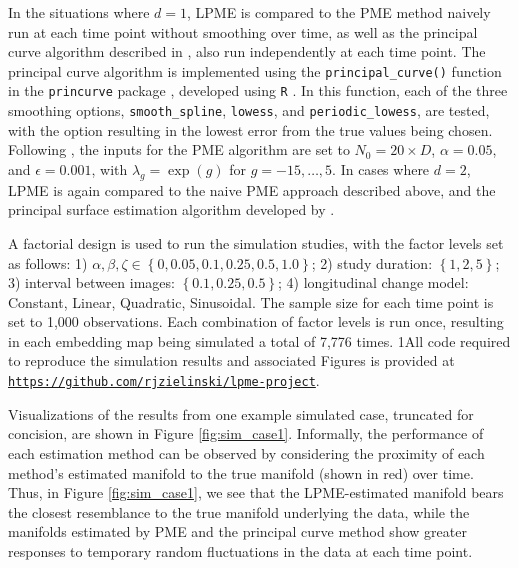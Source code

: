 \documentclass[12pt]{article}
\newcommand{\blind}{1}
\theoremstyle{definition}
\begin{document}
In the situations where $d = 1$, LPME is compared to the PME method naively run at each time point without smoothing over time, as well as the principal curve algorithm described in \cite{hastiePrincipalCurves1989}, also run independently at each time point. The principal curve algorithm is implemented using the \texttt{principal\_curve()} function in the \texttt{princurve} package \citep{Cannoodt2018princurve}, developed using \texttt{R} \citep{rSoftware2023}. In this function, each of the three smoothing options, \texttt{smooth\_spline}, \texttt{lowess}, and \texttt{periodic\_lowess}, are tested, with the option resulting in the lowest error from the true values being chosen. Following \cite{mengPrincipalManifoldEstimation2021}, the inputs for the PME algorithm are set to $N_0 = 20 \times D$, $\alpha = 0.05$, and $\epsilon = 0.001$, with $\lambda_g = \exp(g)$ for $g = -15, \dots, 5$. In cases where $d = 2$, LPME is again compared to the naive PME approach described above, and the principal surface estimation algorithm developed by \cite{yueParameterizationWhiteMatter2016}.

A factorial design is used to run the simulation studies, with the factor levels set as follows: 1) $\alpha, \beta, \zeta \in \left\{0, 0.05, 0.1, 0.25, 0.5, 1.0\right\}$; 2) study duration: $\left\{1, 2, 5\right\}$; 3) interval between images: $\left\{0.1, 0.25, 0.5\right\}$; 4) longitudinal change model: Constant, Linear, Quadratic, Sinusoidal. The sample size for each time point is set to 1,000 observations. Each combination of factor levels is run once, resulting in each embedding map being simulated a total of 7,776 times. \blind{All code required to reproduce the simulation results and associated Figures is provided at \href{https://github.com/rjzielinski/lpme-project}{\texttt{https://github.com/rjzielinski/lpme-project}}.}\fi

Visualizations of the results from one example simulated case, truncated for concision, are shown in Figure \ref{fig:sim_case1}. Informally, the performance of each estimation method can be observed by considering the proximity of each method's estimated manifold to the true manifold (shown in red) over time. Thus, in Figure \ref{fig:sim_case1}, we see that the LPME-estimated manifold bears the closest resemblance to the true manifold underlying the data, while the manifolds estimated by PME and the principal curve method show greater responses to temporary random fluctuations in the data at each time point.
\end{document}
